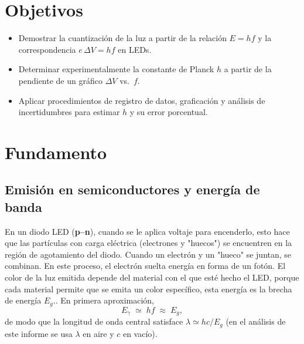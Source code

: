 \documentclass[11pt,twocolumn]{article}
\makeatletter
\let\orig@cite\cite
\renewcommand{\cite}[1]{\textcolor{Blue}{\orig@cite{#1}}}
\let\orig@parencite\parencite
\renewcommand{\parencite}[1]{\textcolor{Blue}{\orig@parencite{#1}}}
\renewcommand{\cite}[1]{\parencite{#1}}      %
\let\orig@cite\cite
\renewcommand{\cite}[1]{\textcolor{Blue}{\orig@cite{#1}}} %
\makeatother
\begin{document}
\section{Objetivos}
\begin{itemize}
    \item Demostrar la cuantización de la luz a partir de la relación $E=hf$ y la correspondencia $e\,\Delta V = hf$ en LEDs.
    \item Determinar experimentalmente la constante de Planck $h$ a partir de la pendiente de un gráfico $\Delta V$ vs.\ $f$.
    \item Aplicar procedimientos de registro de datos, graficación y análisis de incertidumbres para estimar $h$ y su error porcentual.
\end{itemize}

\section{Fundamento}

\subsection*{Emisión en semiconductores y energía de banda}
En un diodo LED (\textbf{p–n}), cuando se le aplica voltaje para encenderlo, esto hace que las partículas con carga eléctrica (electrones y "huecos") se encuentren en la región de agotamiento del diodo.
Cuando un electrón y un "hueco" se juntan, se combinan. En este proceso, el electrón suelta energía en forma de un fotón.
El color de la luz emitida depende del material con el que esté hecho el LED, porque cada material permite que se emita un color específico, esta energía es la brecha de energía $E_g$.\cite{schubert_leds,streetman_sed,bhattacharya_opto}. En primera aproximación,
\begin{equation*}
    E_\gamma \;\simeq\; h f \;\approx\; E_g,
\end{equation*}
de modo que la longitud de onda central satisface \( \lambda \simeq hc/E_g \) (en el análisis de este informe se usa \(\lambda\) en aire y \(c\) en vacío).
\end{document}

